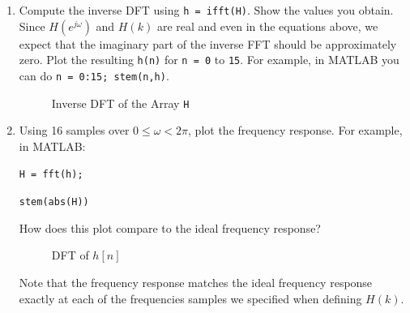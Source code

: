 \documentclass[fleqn]{article}
\begin{document}
\begin{enumerate}
\begin{enumerate}[nolistsep]
			\item Compute the inverse DFT using \texttt{h = ifft(H)}. Show the values you obtain. Since $H(e^{j\omega})$ and $H(k)$ are real and even in the equations above, we expect that the imaginary part of the inverse FFT should be approximately zero. Plot the resulting \texttt{h(n)} for \texttt{n = 0} to \texttt{15}. For example, in MATLAB you can do \texttt{n = 0:15; stem(n,h)}.
			
			\begin{figure}[H]
				\centerline{}
				\caption{Inverse DFT of the Array \texttt{H}}
			\end{figure}
			
			\pagebreak
			\item Using 16 samples over $0 \leq \omega < 2\pi$, plot the frequency response. For example, in MATLAB:
			
			\texttt{H = fft(h);}
			
			\texttt{stem(abs(H))}
			
			How does this plot compare to the ideal frequency response?
			
			\begin{figure}[H]
				\centerline{}
				\caption{DFT of $h[n]$}
			\end{figure}
			
			Note that the frequency response matches the ideal frequency response exactly at each of the frequencies samples we specified when defining $H(k)$.
			

\end{enumerate}
\end{enumerate}
\end{document}
